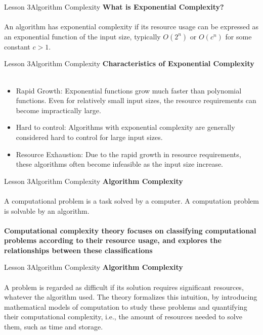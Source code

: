 \documentclass[aspectratio=1610]{beamer}
\begin{document}
\begin{frame}{Lesson 3}{Algorithm Complexity}
\LARGE
\textbf{What is Exponential Complexity?}\\~\\
An algorithm has exponential complexity if its resource usage can be expressed as
an exponential function of the input size, typically $O(2^n)$ or $O(c^n)$ for some
constant $c>1$.
\end{frame}





\begin{frame}{Lesson 3}{Algorithm Complexity}
\LARGE
\textbf{Characteristics of Exponential Complexity}\\~\\
\Large
\begin{itemize}
	\item Rapid Growth: Exponential functions grow much faster than polynomial functions. Even for relatively small input sizes, the resource requirements can become impractically large.
	\item Hard to control: Algorithms with exponential complexity are generally considered hard to control for large input sizes.	
    \item Resource Exhaustion: Due to the rapid growth in resource requirements, these algorithms often become infeasible as the input size increase.
\end{itemize}
\end{frame}



\begin{frame}{Lesson 3}{Algorithm Complexity}
\LARGE
\textbf{Algorithm Complexity}\\~\\
A computational problem is a task solved by a computer. A
computation problem is solvable by an algorithm.\\~\\
\Large
\textbf{Computational complexity theory focuses on classifying
computational problems according to their resource usage, and
explores the relationships between these classifications}
\end{frame}
 

\begin{frame}{Lesson 3}{Algorithm Complexity}
\LARGE
\textbf{Algorithm Complexity}\\~\\
\Large
A problem is regarded as difficult if its solution requires significant 
resources, whatever the algorithm used. The theory formalizes this intuition, 
by introducing mathematical models of computation to study these problems and
quantifying their computational complexity, i.e., the amount of resources 
needed to solve them, such as time and storage.
\end{frame}
\end{document}
